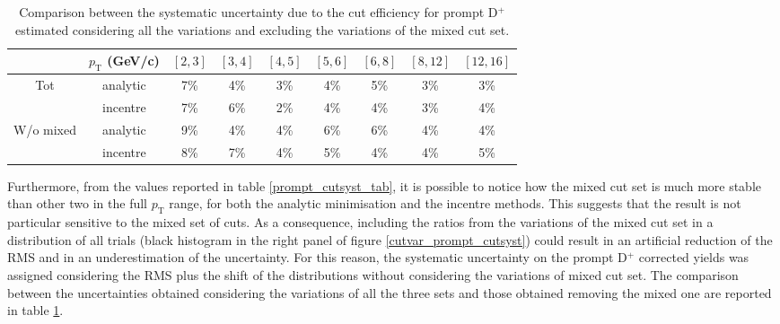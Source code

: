 \documentclass[b5paper,10pt,twoside,oldstyle,classica]{toptesi}
\newcommand{\pt}{p_\text{T}}
\begin{document}
\begin{table}[tb]
\centering 
\begin{center} %
\renewcommand\arraystretch{1.2} 
\fontsize{9}{11}\selectfont
\begin{tabular}{|c|c|c|c|c|c|c|c|c|}
\cline{2-9}
\multicolumn{1}{c|}{} & $\pt$ (GeV/c) & $[2,3]$ & $[3,4]$ & $[4,5]$ & $[5,6]$ & $[6,8]$ & $[8,12]$ & $[12,16]$\\
\hline
\multirow{2}{*}{Tot} & analytic & 7\% & 4\% & 3\% & 4\% & 5\% & 3\% & 3\%\\
& incentre & 7\% & 6\% & 2\% & 4\% & 4\% & 3\% & 4\%\\
\hline
\multirow{2}{*}{W/o mixed} & analytic & 9\% & 4\% & 4\% & 6\% & 6\% & 4\% & 4\%\\
& incentre & 8\% & 7\% & 4\% & 5\% & 4\% & 4\% & 5\%\\
\hline
\end{tabular} 
\caption{Comparison between the systematic uncertainty due to the cut efficiency for prompt D$^+$ estimated considering all the variations and excluding the variations of the mixed cut set.}
\label{cutvar_prompt_syst_comp_tab}
\end{center} 
\end{table} 
Furthermore, from the values reported in table \ref{prompt_cutsyst_tab}, it is possible to notice how the mixed cut set is much more stable than other two in the full $\pt$ range, for both the analytic minimisation and the incentre methods. This suggests that the result is not particular sensitive to the mixed set of cuts. As a consequence, including the ratios from the variations of the mixed cut set in a distribution of all trials (black histogram in the right panel of figure \ref{cutvar_prompt_cutsyst}) could result in an artificial reduction of the RMS and in an underestimation of the uncertainty. For this reason, the systematic uncertainty on the prompt D$^+$ corrected yields was assigned considering the RMS plus the shift of the distributions without considering the variations of mixed cut set.  The comparison between the uncertainties obtained considering the variations of all the three sets and those obtained removing the mixed one are reported in table \ref{cutvar_prompt_syst_comp_tab}.    
\end{document}
